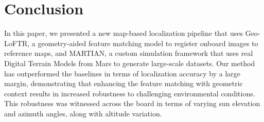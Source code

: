 \section{Conclusion} 
\label{sec:conclusion}
In this paper, we presented a new map-based localization pipeline that uses Geo-LoFTR, a geometry-aided feature matching model to register onboard images to reference maps, and MARTIAN, a custom simulation framework that uses real Digital Terrain Models from Mars to generate large-scale datasets.
Our method has outperformed the baselines in terms of localization accuracy by a large margin, demonstrating that enhancing the feature matching with geometric context results in increased robustness to challenging environmental conditions. This robustness was witnessed across the board in terms of varying sun elevation and azimuth angles, along with altitude variation.


